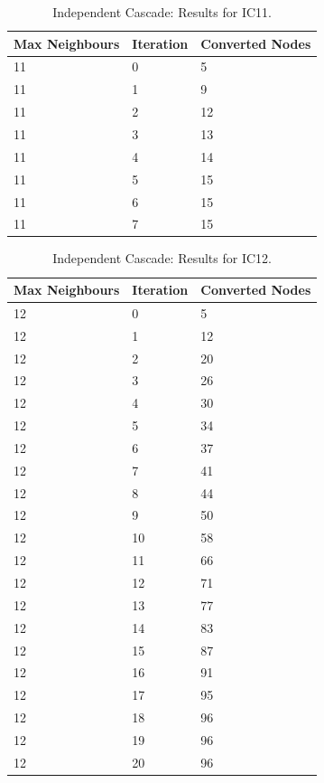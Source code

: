 \begin{table}
\centering
\begin{tabular}{|l||l|l|}
\hline
Max Neighbours & Iteration & Converted Nodes \\
\hline
11 & 0 & 5 \\
11 & 1 & 9 \\
11 & 2 & 12 \\
11 & 3 & 13 \\
11 & 4 & 14 \\
11 & 5 & 15 \\
11 & 6 & 15 \\
11 & 7 & 15 \\
\hline
\end{tabular}
\caption{Independent Cascade: Results for IC11.}
\label{tab:ic_results11}
\end{table}

\begin{table}
\centering
\begin{tabular}{|l||l|l|}
\hline
Max Neighbours & Iteration & Converted Nodes \\
\hline
12 & 0 & 5 \\
12 & 1 & 12 \\
12 & 2 & 20 \\
12 & 3 & 26 \\ 
12 & 4 & 30 \\
12 & 5 & 34 \\
12 & 6 & 37 \\
12 & 7 & 41 \\
12 & 8 & 44 \\
12 & 9 & 50 \\
12 & 10 & 58 \\
12 & 11 & 66 \\
12 & 12 & 71 \\
12 & 13 & 77 \\
12 & 14 & 83 \\
12 & 15 & 87 \\
12 & 16 & 91 \\
12 & 17 & 95 \\
12 & 18 & 96 \\
12 & 19 & 96 \\
12 & 20 & 96 \\
\hline
\end{tabular}
\caption{Independent Cascade: Results for IC12.}
\label{tab:ic_results12}
\end{table}

